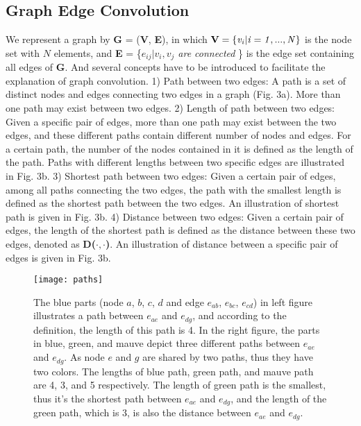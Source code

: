 \documentclass[a4paper,11pt]{article}
\begin{document}
\subsection{Graph Edge Convolution}

We represent a graph by {\bf G} = ({\bf V}, {\bf E}), in which ${\bf V} = {\it \{v_i | i = 1, ... ,N \} }$ is the node set with $N$ elements, and {\bf E} = \{{\it $e_{ij} | v_i, v_j$ are connected }\} is the edge set containing all edges of {\bf G}. And several concepts have to be introduced to facilitate the explanation of graph convolution.
1) Path between two edges: A path is a set of distinct nodes and edges connecting two edges in a graph (Fig. 3a). More than one path may exist between two edges.
 2) Length of path between two edges:  Given a specific pair of edges, more than one path may exist between the two edges, and these different paths contain different number of nodes and edges. For a certain path, the number of the nodes contained in it is defined as the length of the path. Paths with different lengths between two specific edges are illustrated in Fig. 3b.
 3) Shortest path between two edges: Given a certain pair of edges, among all paths connecting the two edges, the path with the smallest length is defined as the shortest path between the two edges. An illustration of shortest path is given in Fig. 3b.
4) Distance between two edges: Given a certain pair of edges, the length of the shortest path is defined as the distance between these two edges, denoted as {\bf D($\cdot,\cdot$)}. An illustration of distance between a specific pair of edges is given in Fig. 3b.



\begin{figure}
\centering
\texttt{[image: paths]}
\caption{The blue parts (node $a$, $b$, $c$, $d$ and edge $e_{ab}$, $e_{bc}$, $e_{cd}$) in left figure illustrates a path between $e_{ae}$ and $e_{dg}$, and according to the definition, the length of this path is 4. In the right figure, the parts in blue, green, and mauve depict three different paths between $e_{ae}$ and $e_{dg}$. As node $e$ and $g$ are shared by two paths, thus they have two colors. The lengths of blue path, green path, and mauve path are 4, 3, and 5 respectively. The length of green path is the smallest, thus it's the shortest path between $e_{ae}$ and $e_{dg}$, and the length of the green path, which is 3, is also the distance between $e_{ae}$ and $e_{dg}$.}
\label{fig:example}
\end{figure}
\end{document}
